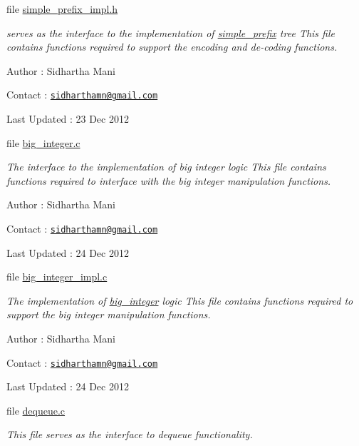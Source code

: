 \begin{DoxyCompactItemize}
\begin{DoxyCompactList}
 \end{DoxyCompactList}\item 
file \hyperlink{simple__prefix__impl_8h}{simple\-\_\-prefix\-\_\-impl.\-h}
\begin{DoxyCompactList}\small\item\em serves as the interface to the implementation of \hyperlink{structsimple__prefix}{simple\-\_\-prefix} tree This file contains functions required to support the encoding and de-\/coding functions.\par
 Author \-: Sidhartha Mani\par
 Contact \-: \href{mailto:sidharthamn@gmail.com}{\tt sidharthamn@gmail.\-com} \par
 Last Updated \-: 23 Dec 2012 \par
 \end{DoxyCompactList}\item 
file \hyperlink{big__integer_8c}{big\-\_\-integer.\-c}
\begin{DoxyCompactList}\small\item\em The interface to the implementation of big integer logic This file contains functions required to interface with the big integer manipulation functions.\par
 Author \-: Sidhartha Mani\par
 Contact \-: \href{mailto:sidharthamn@gmail.com}{\tt sidharthamn@gmail.\-com} \par
 Last Updated \-: 24 Dec 2012 \par
 \end{DoxyCompactList}\item 
file \hyperlink{big__integer__impl_8c}{big\-\_\-integer\-\_\-impl.\-c}
\begin{DoxyCompactList}\small\item\em The implementation of \hyperlink{big__integer__impl_8h_structbig__integer}{big\-\_\-integer} logic This file contains functions required to support the big integer manipulation functions.\par
 Author \-: Sidhartha Mani\par
 Contact \-: \href{mailto:sidharthamn@gmail.com}{\tt sidharthamn@gmail.\-com} \par
 Last Updated \-: 24 Dec 2012 \par
 \end{DoxyCompactList}\item 
file \hyperlink{dequeue_8c}{dequeue.\-c}
\begin{DoxyCompactList}\small\item\em This file serves as the interface to dequeue functionality. \par

\end{DoxyCompactList}
\end{DoxyCompactItemize}
